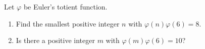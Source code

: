 Let $\varphi$ be Euler's totient function.
\begin{enumerate}
\item[(a)] Find the smallest positive integer $n$ with $\varphi(n)\varphi(6)=8$.
\item[(b)] Is there a positive integer $m$ with $\varphi(m)\varphi(6)=10$?
\end{enumerate}
